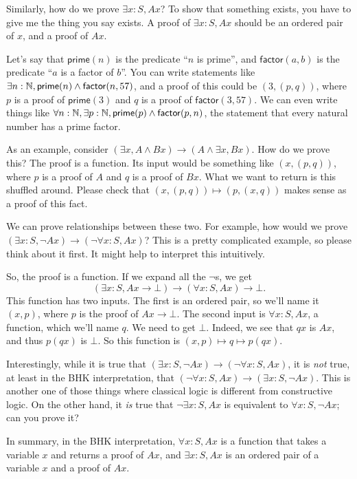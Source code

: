 \documentclass[11pt,paper=letter]{scrartcl}
\renewcommand{\sf}{\mathsf}
\renewcommand{\land}{\wedge}
\renewcommand{\lnot}{\neg}
\newcommand{\false}{\bot}
\begin{document}
Similarly, how do we prove $\exists x: S, Ax$? To show that something exists, you have to give me the thing you say exists. A proof of $\exists x: S, Ax$ should be an ordered pair of $x$, and a proof of $Ax$.

Let's say that $\sf{prime}(n)$ is the predicate ``$n$ is prime'', and $\sf{factor}(a, b)$ is the predicate ``$a$ is a factor of $b$''. You can write statements like $\exists n: \NN, \sf{prime}(n) \land \sf{factor}(n, 57)$, and a proof of this could be $(3, (p, q))$, where $p$ is a proof of $\sf{prime}(3)$ and $q$ is a proof of $\sf{factor}(3, 57)$. We can even write things like $\forall n: \NN, \exists p: \NN, \sf{prime}(p) \land \sf{factor}(p, n)$, the statement that every natural number has a prime factor.

As an example, consider $(\exists x, A \land Bx) \to (A \land \exists x, Bx)$. How do we prove this? The proof is a function. Its input would be something like $(x, (p, q))$, where $p$ is a proof of $A$ and $q$ is a proof of $Bx$. What we want to return is this shuffled around. Please check that $(x, (p, q)) \mapsto (p, (x, q))$ makes sense as a proof of this fact.

We can prove relationships between these two. For example, how would we prove $(\exists x: S, \lnot Ax) \to (\lnot \forall x: S, Ax)$?  This is a pretty complicated example, so please think about it first. It might help to interpret this intuitively.

So, the proof is a function. If we expand all the $\lnot$s, we get \[
(\exists x: S, Ax \to \false) \to (\forall x: S, Ax) \to \false.\] This function has two inputs. The first is an ordered pair, so we'll name it $(x, p)$, where $p$ is the proof of $Ax \to \false$. The second input is $\forall x: S, Ax$, a function, which we'll name $q$. We need to get $\false$. Indeed, we see that $qx$ is $Ax$, and thus $p(qx)$ is $\false$. So this function is $(x, p) \mapsto q \mapsto p(qx)$.

Interestingly, while it is true that $(\exists x: S, \lnot Ax) \to (\lnot \forall x:S, Ax)$, it is \emph{not} true, at least in the BHK interpretation, that $(\lnot \forall x:S, Ax) \to (\exists x: S, \lnot Ax)$. This is another one of those things where classical logic is different from constructive logic. On the other hand, it \emph{is} true that $\lnot \exists x: S, Ax$ is equivalent to $\forall x: S, \lnot Ax$; can you prove it?

In summary, in the BHK interpretation, $\forall x:S, Ax$ is a function that takes a variable $x$ and returns a proof of $Ax$, and $\exists x:S, Ax$ is an ordered pair of a variable $x$ and a proof of $Ax$.
\end{document}
